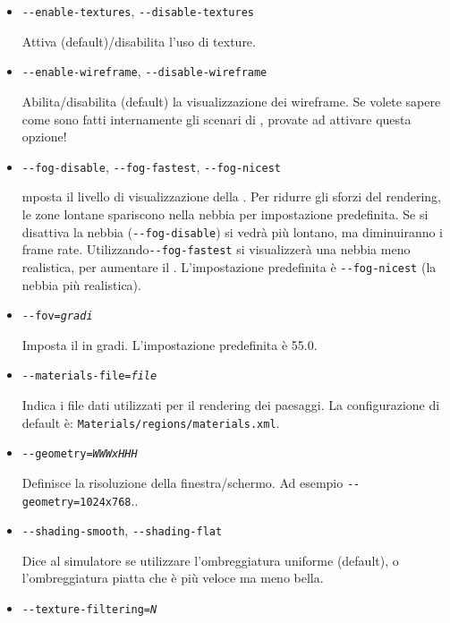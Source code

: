 \begin{itemize}
{\begin{itemize}
  \item{\texttt{-$ $-enable-textures}, \texttt{-$ $-disable-textures}}

  Attiva (default)/disabilita l'uso di texture.

  \item{\texttt{-$ $-enable-wireframe}, \texttt{-$ $-disable-wireframe}}

  Abilita/disabilita (default) la visualizzazione dei wireframe.
  Se volete sapere come sono fatti internamente gli scenari di \FlightGear{},
  provate ad attivare questa opzione! 

  \item{\texttt{-$ $-fog-disable}, \texttt{-$ $-fog-fastest}, \texttt{-$ $-fog-nicest}}

  mposta il livello di visualizzazione della . Per ridurre gli sforzi del rendering,
  le zone lontane spariscono nella nebbia per impostazione predefinita. Se si disattiva la nebbia
  (\texttt{-$ $-fog-disable}) si vedr\`{a} pi\`{u} lontano, ma diminuiranno i frame rate.
  Utilizzando\texttt{-$ $-fog-fastest} si visualizzer\`{a} una nebbia meno realistica,
  per aumentare il . L'impostazione predefinita \`{e}  \texttt{-$ $-fog-nicest}
  (la nebbia pi\`{u} realistica).

  \item{\texttt{-$ $-fov={\it gradi}}}

  Imposta il  in gradi. L'impostazione predefinita \`{e} 55.0.

  \item{\texttt{-$ $-materials-file={\it file}}}

  Indica i file dati utilizzati per il rendering dei paesaggi.
  La configurazione di default \`{e}:  \texttt{Materials/regions/materials.xml}.

  \item{\texttt{-$ $-geometry={\it WWWxHHH}}}

  Definisce la risoluzione della finestra/schermo.
  Ad esempio \texttt{-$ $-geometry=1024x768}..

  \item{\texttt{-$ $-shading-smooth}, \texttt{-$ $-shading-flat}}

  Dice al simulatore se utilizzare l'ombreggiatura uniforme (default), o
  l'ombreggiatura piatta che \`{e} pi\`{u} veloce ma meno bella.

  \item{\texttt{-$ $-texture-filtering={\it N}}}


\end{itemize}}
\end{itemize}
